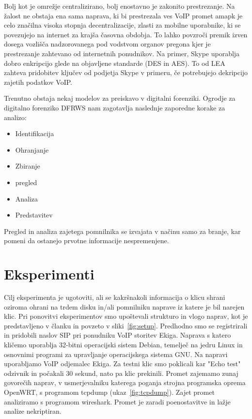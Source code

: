 \documentclass{acm_proc_article-sp}
\begin{document}
Bolj kot je omrežje centralizirano, bolj enostavno je zakonito prestrezanje. Na žalost ne obstaja ena sama naprava, ki bi prestrezala ves VoIP promet amapk je celo značilna visoka stopnja decentralizacije, zlasti za mobilne uporabnike, ki se povezujejo na internet za krajša časovna obdobja. To lahko povzroči premik izven dosega vozlišča nadzorovanega pod vodstvom organov pregona kjer je prestrezanje zahtevano od internetnih ponudnikov. Na primer, Skype uporablja dobro enkripcijo glede na objavljene standarde (DES in AES). To od LEA zahteva pridobitev ključev od podjetja Skype v primeru, če potrebujejo dekripcijo zajetih podatkov VoIP.

Trenutno obstaja nekaj modelov za preiskavo v digitalni forenziki. Ogrodje za digitalno forenziko DFRWS nam zagotavlja naslednje zaporedne korake za analizo:
\begin{itemize}
  \item Identifikacija
  \item Ohranjanje
  \item Zbiranje
  \item pregled
  \item Analiza
  \item Predstavitev
\end{itemize}

Pregled in analiza zajetega pomnilnika se izvajata v načinu samo za branje, kar pomeni da ostanejo prvotne informacije nespremenjene.


\section{Eksperimenti}

Cilj eksperimenta je ugotoviti, ali se kakršnakoli informacija o klicu shrani oziroma ohrani na trdem disku in/ali pomnilniku naprave iz katere je bil narejen klic. Pri ponovitvi eksperimentov smo upoštevali strukturo in vlogo naprav, kot je predstavljeno v članku in povzeto v sliki~\ref{fig:setup}. Predhodno smo se registrirali in pridobili naslov SIP pri ponudniku VoIP storitev Ekiga. Naprava s katero kličemo uporablja 32-bitni operacijski sistem Debian, temelječ na jedru Linux in osnovnimi programi za upravljanje operacijskega sistema GNU. Na napravi uporabljamo VoIP odjemalec Ekiga. Za testni klic smo poklicali kar "Echo test" odzivnik in počakali 30 sekund, nato pa klic prekinili. Promet zajemamo zunaj govorečih naprav, v usmerjevalniku katerega poganja strojna programska oprema OpenWRT, s programom tcpdump (ukaz~\ref{fig:tcpdump}). Zajet promet analiziramo s programom wireshark. Promet je zaradi poenostavitve in lažje analize nekriptiran.
\end{document}
